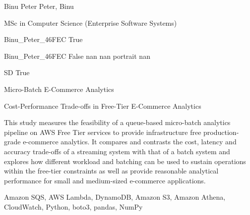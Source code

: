 
\begingroup{}\relax



\def\Key{Binu_Peter_46FEC}

{Binu Peter}
{Peter, Binu}

{MSc in Computer Science (Enterprise Software Systems)}

{Binu_Peter_46FEC}
{True}

{Binu_Peter_46FEC}
{False}
{nan}
{nan}
{portrait}
{nan}

{SD}
{True}

{Micro-Batch E-Commerce Analytics}

{Cost-Performance Trade-offs in Free-Tier E-Commerce Analytics}

{This study measures the feasibility of a queue-based micro-batch analytics pipeline on AWS Free Tier services to provide infrastructure free production-grade e-commerce analytics. It compares and contrasts the cost, latency and accuracy trade-offs of a streaming system with that of a batch system and explores how different workload and batching can be used to sustain operations within the free-tier constraints as well as provide reasonable analytical performance for small and medium-sized e-commerce applications.}

{Amazon SQS, AWS Lambda, DynamoDB, Amazon S3, Amazon Athena, CloudWatch, Python, boto3, pandas, NumPy}

